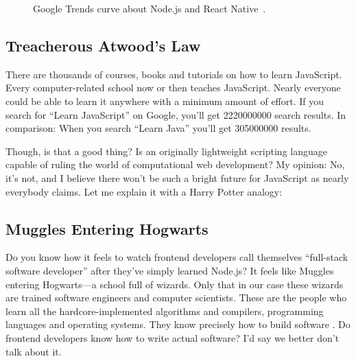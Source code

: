 \documentclass[10pt]{article}  %
\newcommand{\floatcaption}[2]{\caption[#1.]{#1~#2.}}
\begin{document}
\begin{sloppypar}
  \begin{figure}[ht]
    \centering
    \floatcaption{Google Trends curve about Node.js and React Native}{\citep{google_google_nodate}}
    \label{fig:atwood-law}
  \end{figure}

  \subsection{Treacherous Atwood’s Law}
  \label{sec:atwood-law}

  There are thousands of courses, books and tutorials on how to learn JavaScript. Every computer-related school now or then teaches JavaScript. Nearly everyone could be able to learn it anywhere with a minimum amount of effort. If you search for “Learn JavaScript” on Google, you’ll get \num{2220000000} search results. In comparison: When you search “Learn Java” you’ll get \num{305000000} results.

  Though, is that a good thing? Is an originally lightweight scripting language capable of ruling the world of computational web development? My opinion: No, it’s not, and I believe there won’t be such a bright future for JavaScript as nearly everybody claims. Let me explain it with a Harry Potter analogy:

  \subsection{Muggles Entering Hogwarts}
  \label{sec:muggles}

  Do you know how it feels to watch frontend developers call themselves “full-stack software developer” after they’ve simply learned Node.js? It feels like Muggles entering Hogwarts—a school full of wizards. Only that in our case these wizards are trained software engineers and computer scientists. These are the people who learn all the hardcore-implemented algorithms and compilers, programming languages and operating systems. They know precisely how to build software \citep{might_what_2011}. Do frontend developers know how to write actual software? I’d say we better don’t talk about it.


\end{sloppypar}
\end{document}
